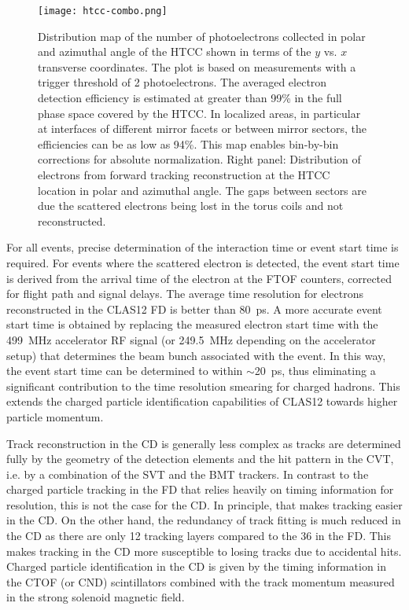 \documentclass[final,3p]{elsarticle}
\begin{document}
\begin{twocolumn}
\begin{figure}[t!]
\centerline{\texttt{[image: htcc-combo.png]}}
\caption{Distribution map of the number of photoelectrons collected in polar and azimuthal angle of the HTCC shown
  in terms of the $y$ vs. $x$ transverse coordinates. The plot is based on measurements with a trigger threshold of
  2 photoelectrons. The averaged electron detection efficiency is estimated at greater than 99\% in the full phase
  space covered by the HTCC. In localized areas, in particular at interfaces of different mirror facets or between
  mirror sectors, the efficiencies can be as low as 94\%. This map enables bin-by-bin corrections for absolute
  normalization. Right panel: Distribution of electrons from forward tracking reconstruction at the HTCC location in
  polar and azimuthal angle. The gaps between sectors are due the scattered electrons being lost in the torus coils and
  not reconstructed.}
\label{htcc-performance} 
\end{figure}

For all events, precise determination of the interaction time or event start time is required. For events where the
scattered electron is detected, the event start time is derived from the arrival time of the electron at the FTOF
counters, corrected for flight path and signal delays.  The average time resolution for electrons reconstructed in
the CLAS12 FD is better than 80~ps. A more accurate event start time is obtained by replacing the measured
electron start time with the 499~MHz accelerator RF signal (or 249.5~MHz depending on the accelerator setup)
that determines the beam bunch associated with the event. In this way, the event start time can be determined to
within $\sim$20~ps, thus eliminating a significant contribution to the time resolution smearing for charged hadrons.
This extends the charged particle identification capabilities of CLAS12 towards higher particle momentum.

Track reconstruction in the CD is generally less complex as tracks are determined fully by the geometry of the 
detection elements and the hit pattern in the CVT, i.e. by a combination of the SVT and the BMT trackers.  In
contrast to the charged particle tracking in the FD that relies heavily on timing information for resolution, this
is not the case for the CD. In principle, that makes tracking easier in the CD. On the other hand, the redundancy
of track fitting is much reduced in the CD as there are only 12 tracking layers compared to the 36 in the FD. This
makes tracking in the CD more susceptible to losing tracks due to accidental hits. Charged particle identification
in the CD is given by the timing information in the CTOF (or CND) scintillators combined with the track momentum
measured in the strong solenoid magnetic field.


\end{twocolumn}
\end{document}
